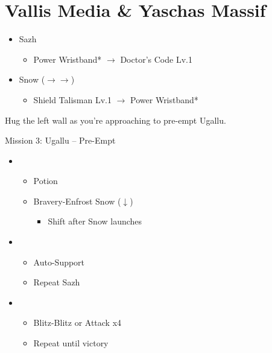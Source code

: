 \chapter{Vallis Media \& Yaschas Massif}

\begin{menu}
	\begin{itemize}
		\equip
		\begin{itemize}
			\item Sazh
				\begin{itemize}
					\item Power Wristband* $\rightarrow$ Doctor's Code Lv.1
				\end{itemize}
			\item Snow ($\rightarrow\rightarrow$)
			    \begin{itemize}
					\item Shield Talisman Lv.1 $\rightarrow$ Power Wristband*
			    \end{itemize}
		\end{itemize}
	\end{itemize}
\end{menu}

Hug the left wall as you're approaching to pre-empt Ugallu.

\begin{battle}{Mission 3: Ugallu -- Pre-Empt}
	\begin{itemize}
		\item \third
			\begin{itemize}
				\item Potion
				\item Bravery-Enfrost Snow ($\downarrow$)
					\begin{itemize}
						\item Shift after Snow launches
					\end{itemize}
			\end{itemize}
		\item \fourth
			\begin{itemize}
				\item Auto-Support
				\item Repeat Sazh
			\end{itemize}
		\item \fifth
			\begin{itemize}
				\item Blitz-Blitz or Attack x4
				\item Repeat until victory
			\end{itemize}
	\end{itemize}
\end{battle}

